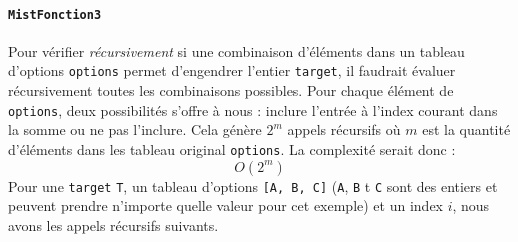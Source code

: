 \documentclass[9pt]{report}
\begin{document}
\begin{multicols*}{2}
  \paragraph{\textbf{\texttt{MistFonction3}}}
  Pour vérifier \textit{récursivement}   
  si une combinaison d'éléments dans un tableau d'options \texttt{options} 
  permet d'engendrer l'entier \texttt{target}, il faudrait évaluer 
  récursivement toutes les combinaisons possibles. Pour chaque élément 
  de \texttt{options}, deux possibilités s'offre à nous : inclure l'entrée à l'index 
  courant dans la somme ou ne pas l'inclure. Cela génère $2^m$ appels récursifs 
  où $m$ est la quantité d'éléments dans les tableau original \texttt{options}.   
  La complexité serait donc :
  \[ O(2^m) \]
  Pour une \texttt{target} \texttt{T}, un tableau d'options \texttt{[A, B, C]} 
  (\texttt{A}, \texttt{B} t \texttt{C} sont des entiers et peuvent prendre n'importe quelle 
  valeur pour cet exemple) et un 
  index $i$, nous avons les appels récursifs suivants. 

























\end{multicols*}
\end{document}
